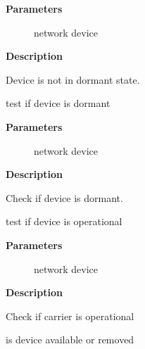 \documentclass[a4paper,8pt,english]{sphinxmanual}
\begin{document}
\textbf{Parameters}
\begin{description}
\item[{}] \leavevmode
network device

\end{description}

\textbf{Description}

Device is not in dormant state.

\begin{fulllineitems}
\label{networking/kapi:c.netif_dormant}
test if device is dormant

\end{fulllineitems}


\textbf{Parameters}
\begin{description}
\item[{}] \leavevmode
network device

\end{description}

\textbf{Description}

Check if device is dormant.

\begin{fulllineitems}
\label{networking/kapi:c.netif_oper_up}
test if device is operational

\end{fulllineitems}


\textbf{Parameters}
\begin{description}
\item[{}] \leavevmode
network device

\end{description}

\textbf{Description}

Check if carrier is operational

\begin{fulllineitems}
\label{networking/kapi:c.netif_device_present}
is device available or removed

\end{fulllineitems}
\end{document}
